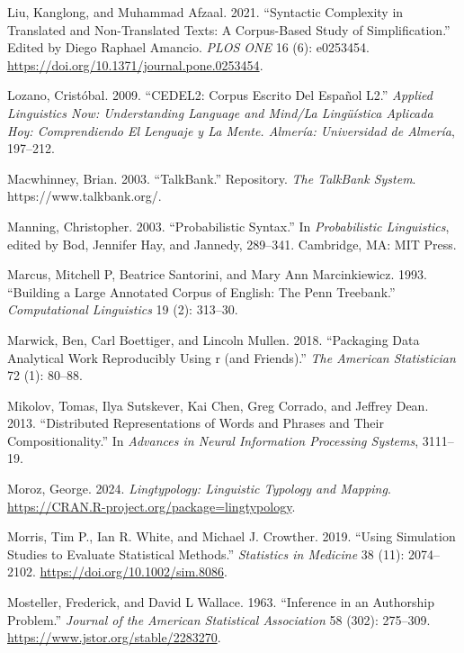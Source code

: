 \documentclass[
  letterpaper,
]{latex/krantz}
\newlength{\cslhangindent}
\newenvironment{CSLReferences}[2] %
 {\begin{list}{}{%
  \setlength{\itemindent}{0pt}
  \setlength{\leftmargin}{0pt}
  \setlength{\parsep}{0pt}
  \ifodd #1
   \setlength{\leftmargin}{\cslhangindent}
   \setlength{\itemindent}{-1\cslhangindent}
  \fi
  \setlength{\itemsep}{#2\baselineskip}}}
 {\end{list}}
\theoremstyle{definition}
\theoremstyle{remark}
\begin{document}
\begin{CSLReferences}{1}{0}
Liu, Kanglong, and Muhammad Afzaal. 2021. {``Syntactic Complexity in
Translated and Non-Translated Texts: A Corpus-Based Study of
Simplification.''} Edited by Diego Raphael Amancio. \emph{PLOS ONE} 16
(6): e0253454. \url{https://doi.org/10.1371/journal.pone.0253454}.

Lozano, Cristóbal. 2009. {``CEDEL2: Corpus Escrito Del Espa{ñ}ol L2.''}
\emph{Applied Linguistics Now: Understanding Language and Mind/La
Ling{ü}{í}stica Aplicada Hoy: Comprendiendo El Lenguaje y La Mente.
Almer{í}a: Universidad de Almer{í}a}, 197--212.

Macwhinney, Brian. 2003. {``TalkBank.''} Repository. \emph{The TalkBank
System}. https://www.talkbank.org/.

Manning, Christopher. 2003. {``Probabilistic Syntax.''} In
\emph{Probabilistic Linguistics}, edited by Bod, Jennifer Hay, and
Jannedy, 289--341. Cambridge, MA: MIT Press.

Marcus, Mitchell P, Beatrice Santorini, and Mary Ann Marcinkiewicz.
1993. {``Building a Large Annotated Corpus of English: The Penn
Treebank.''} \emph{Computational Linguistics} 19 (2): 313--30.

Marwick, Ben, Carl Boettiger, and Lincoln Mullen. 2018. {``Packaging
Data Analytical Work Reproducibly Using r (and Friends).''} \emph{The
American Statistician} 72 (1): 80--88.

Mikolov, Tomas, Ilya Sutskever, Kai Chen, Greg Corrado, and Jeffrey
Dean. 2013. {``Distributed Representations of Words and Phrases and
Their Compositionality.''} In \emph{Advances in Neural Information
Processing Systems}, 3111--19.

Moroz, George. 2024. \emph{Lingtypology: Linguistic Typology and
Mapping}. \url{https://CRAN.R-project.org/package=lingtypology}.

Morris, Tim P., Ian R. White, and Michael J. Crowther. 2019. {``Using
Simulation Studies to Evaluate Statistical Methods.''} \emph{Statistics
in Medicine} 38 (11): 2074--2102.
\url{https://doi.org/10.1002/sim.8086}.

Mosteller, Frederick, and David L Wallace. 1963. {``Inference in an
Authorship Problem.''} \emph{Journal of the American Statistical
Association} 58 (302): 275--309.
\url{https://www.jstor.org/stable/2283270}.


\end{CSLReferences}
\end{document}
